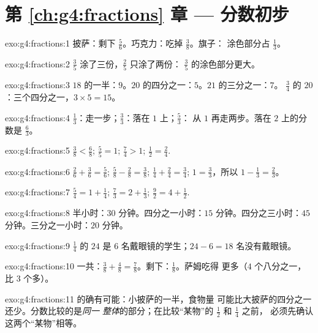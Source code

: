 \section*{第 \ref{ch:g4:fractions} 章 --- 分数初步}

\begin{solution}{exo:g4:fractions:1}
披萨：剩下 $\frac56$。巧克力：吃掉 $\frac38$。旗子：
涂色部分占 $\frac13$。
\end{solution}

\begin{solution}{exo:g4:fractions:2}
$\frac35$ 涂了三份，$\frac25$ 只涂了两份：
$\frac35$ 的涂色部分更大。
\end{solution}

\begin{solution}{exo:g4:fractions:3}
$18$ 的一半：$9$。$20$ 的四分之一：$5$。$21$ 的三分之一：$7$。
$\frac34$ 的 $20$：三个四分之一，$3 \times 5 = 15$。
\end{solution}

\begin{solution}{exo:g4:fractions:4}
$\frac13$：走一步；$\frac33$：落在 $1$ 上；$\frac53$：
从 $1$ 再走两步。落在 $2$ 上的分数是 $\frac63$。
\end{solution}

\begin{solution}{exo:g4:fractions:5}
$\frac38 < \frac68$; \quad $\frac55 = 1$; \quad $\frac74 > 1$;
\quad $\frac12 = \frac24$.
\end{solution}

\begin{solution}{exo:g4:fractions:6}
$\frac26 + \frac36 = \frac56$; \quad
$\frac58 - \frac28 = \frac38$; \quad
$\frac14 + \frac24 = \frac34$; \quad
$1 = \frac33$，所以 $1 - \frac13 = \frac23$。
\end{solution}

\begin{solution}{exo:g4:fractions:7}
$\frac54 = 1 + \frac14$; \quad
$\frac73 = 2 + \frac13$; \quad
$\frac92 = 4 + \frac12$.
\end{solution}

\begin{solution}{exo:g4:fractions:8}
半小时：$30$ 分钟。四分之一小时：$15$ 分钟。四分之三小时：$45$
分钟。三分之一小时：$20$ 分钟。
\end{solution}

\begin{solution}{exo:g4:fractions:9}
$\frac14$ 的 $24$ 是 $6$ 名戴眼镜的学生；$24 - 6 = 18$
名没有戴眼镜。
\end{solution}

\begin{solution}{exo:g4:fractions:10}
一共：$\frac38 + \frac48 = \frac78$。剩下：$\frac18$。萨姆吃得
更多（$4$ 个八分之一，比 $3$ 个多）。
\end{solution}

\begin{solution}{exo:g4:fractions:11}
的确有可能：小披萨的一半，食物量
可能比大披萨的四分之一还少。分数比较的是\emph{同一
整体}的部分；在比较“某物”的 $\frac12$ 和 $\frac14$ 之前，
必须先确认这两个“某物”相等。
\end{solution}
